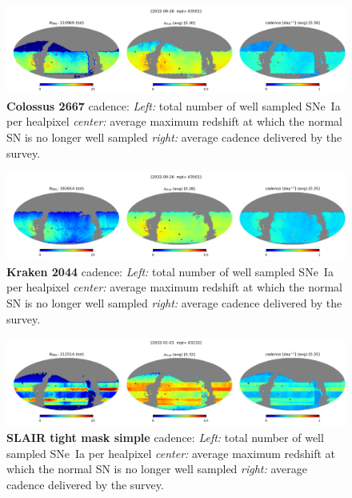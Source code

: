 \begin{figure}[h!]
  \begin{center}
    \includegraphics[width=\linewidth]{Figures/colossus_2667_64_maps.png}
    \caption{{\bf Colossus 2667} cadence: {\em Left:} total number of well
      sampled SNe~Ia per healpixel {\em center:} average maximum
      redshift at which the normal SN is no longer well sampled {\em
        right:} average cadence delivered by the survey.}
  \end{center}
  \label{fig:colossus_2667}
\end{figure}

\begin{figure}[h!]
  \begin{center}
    \includegraphics[width=\linewidth]{Figures/kraken_2044_64_maps.png}
    \caption{{\bf Kraken 2044} cadence: {\em Left:} total number of well
      sampled SNe~Ia per healpixel {\em center:} average maximum
      redshift at which the normal SN is no longer well sampled {\em
        right:} average cadence delivered by the survey.}
    \label{fig:kraken_2044}
  \end{center}
\end{figure}

\begin{figure}[h!]
  \begin{center}
    \includegraphics[width=\linewidth]{Figures/tight_mask_simple_10yrs_64_maps.png}
    \caption{{\bf SLAIR tight mask simple} cadence: {\em Left:} total number of well
      sampled SNe~Ia per healpixel {\em center:} average maximum
      redshift at which the normal SN is no longer well sampled {\em
        right:} average cadence delivered by the survey.}
    \label{fig:tight_mask_simple}
  \end{center}
\end{figure}

